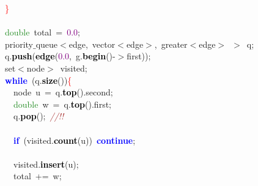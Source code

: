 {{\mbox{}\ \ \ \ \textcolor{Red}{\}} \\
\mbox{} \\
\mbox{}\ \ \ \ \textcolor{ForestGreen}{double}\ total\ \textcolor{BrickRed}{=}\ \textcolor{Purple}{0.0}\textcolor{BrickRed}{;} \\
\mbox{}\ \ \ \ priority$\_$queue\textcolor{BrickRed}{$<$}edge\textcolor{BrickRed}{,}\ vector\textcolor{BrickRed}{$<$}edge\textcolor{BrickRed}{$>$,}\ greater\textcolor{BrickRed}{$<$}edge\textcolor{BrickRed}{$>$}\ \textcolor{BrickRed}{$>$}\ q\textcolor{BrickRed}{;} \\
\mbox{}\ \ \ \ q\textcolor{BrickRed}{.}\textbf{\textcolor{Black}{push}}\textcolor{BrickRed}{(}\textbf{\textcolor{Black}{edge}}\textcolor{BrickRed}{(}\textcolor{Purple}{0.0}\textcolor{BrickRed}{,}\ g\textcolor{BrickRed}{.}\textbf{\textcolor{Black}{begin}}\textcolor{BrickRed}{()-$>$}first\textcolor{BrickRed}{));} \\
\mbox{}\ \ \ \ set\textcolor{BrickRed}{$<$}node\textcolor{BrickRed}{$>$}\ visited\textcolor{BrickRed}{;} \\
\mbox{}\ \ \ \ \textbf{\textcolor{Blue}{while}}\ \textcolor{BrickRed}{(}q\textcolor{BrickRed}{.}\textbf{\textcolor{Black}{size}}\textcolor{BrickRed}{())}\textcolor{Red}{\{} \\
\mbox{}\ \ \ \ \ \ node\ u\ \textcolor{BrickRed}{=}\ q\textcolor{BrickRed}{.}\textbf{\textcolor{Black}{top}}\textcolor{BrickRed}{().}second\textcolor{BrickRed}{;} \\
\mbox{}\ \ \ \ \ \ \textcolor{ForestGreen}{double}\ w\ \textcolor{BrickRed}{=}\ q\textcolor{BrickRed}{.}\textbf{\textcolor{Black}{top}}\textcolor{BrickRed}{().}first\textcolor{BrickRed}{;} \\
\mbox{}\ \ \ \ \ \ q\textcolor{BrickRed}{.}\textbf{\textcolor{Black}{pop}}\textcolor{BrickRed}{();}\ \textit{\textcolor{Brown}{//!!}} \\
\mbox{} \\
\mbox{}\ \ \ \ \ \ \textbf{\textcolor{Blue}{if}}\ \textcolor{BrickRed}{(}visited\textcolor{BrickRed}{.}\textbf{\textcolor{Black}{count}}\textcolor{BrickRed}{(}u\textcolor{BrickRed}{))}\ \textbf{\textcolor{Blue}{continue}}\textcolor{BrickRed}{;} \\
\mbox{} \\
\mbox{}\ \ \ \ \ \ visited\textcolor{BrickRed}{.}\textbf{\textcolor{Black}{insert}}\textcolor{BrickRed}{(}u\textcolor{BrickRed}{);} \\
\mbox{}\ \ \ \ \ \ total\ \textcolor{BrickRed}{+=}\ w\textcolor{BrickRed}{;} \\
}}
